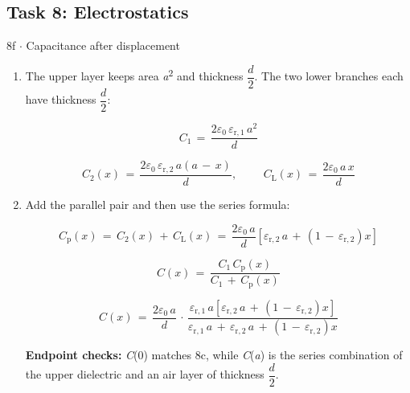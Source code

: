\documentclass[11pt]{article}
\begin{document}
\begin{keepsection}\subsection{Task 8: Electrostatics}

\begin{workedbox}{8f \ensuremath{\cdot} Capacitance after displacement}
\begin{enumerate}
\item {}
The upper layer keeps area \textit{a}\textsuperscript{2} and thickness {\small\ensuremath{\dfrac{{d}}{2}}}. The two lower branches each have thickness {\small\ensuremath{\dfrac{{d}}{2}}}:

\begin{equation*}{C}_{1}\, =\, \dfrac{2ε_{0}\, ε_{\mathrm{r},1}\, {a}^{2}}{{d}}\end{equation*}

\begin{equation*}{C}_{2}({x})\, =\, \dfrac{2ε_{0}\, ε_{\mathrm{r},2}\, {a}({a}\, -\, {x})}{{d}},\quad \, \quad \, {C}_{\mathrm{L}}({x})\, =\, \dfrac{2ε_{0}\, {a}\, {x}}{{d}}\end{equation*}
\item {}
Add the parallel pair and then use the series formula:

\begin{equation*}{C}_{\mathrm{p}}({x})\, =\, {C}_{2}({x})\, +\, {C}_{\mathrm{L}}({x})\, =\, \dfrac{2ε_{0}\, {a}}{{d}}[ε_{\mathrm{r},2}\, {a}\, +\, (1\, -\, ε_{\mathrm{r},2}){x}]\end{equation*}

\begin{equation*}{C}({x})\, =\, \dfrac{{C}_{1}\, {C}_{\mathrm{p}}({x})}{{C}_{1}\, +\, {C}_{\mathrm{p}}({x})}\end{equation*}

\begin{equation*}{C}({x})\, =\, \dfrac{2ε_{0}\, {a}}{{d}}\, \cdot \, \dfrac{ε_{\mathrm{r},1}\, {a}[ε_{\mathrm{r},2}\, {a}\, +\, (1\, -\, ε_{\mathrm{r},2}){x}]}{ε_{\mathrm{r},1}\, {a}\, +\, ε_{\mathrm{r},2}\, {a}\, +\, (1\, -\, ε_{\mathrm{r},2}){x}}\end{equation*}

\textbf{Endpoint checks:} \textit{C}(0) matches 8c, while \textit{C}(\textit{a}) is the series combination of the upper dielectric and an air layer of thickness {\small\ensuremath{\dfrac{{d}}{2}}}.
\end{enumerate}
\end{workedbox}

\end{keepsection}
\end{document}
